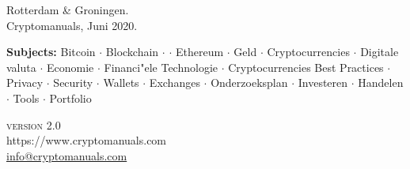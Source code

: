 \begin{titlepage}
{		

        \vspace{1cm}
        
        \small{
        Rotterdam \& Groningen.\\
        Cryptomanuals, Juni 2020.}
        
        \vspace{.5cm}
        
        \small{\textbf{Subjects:} Bitcoin $\cdot$ Blockchain $\cdot$  $\cdot$ Ethereum $\cdot$ Geld $\cdot$ Cryptocurrencies $\cdot$ Digitale valuta $\cdot$ Economie $\cdot$ Financi{"e}le Technologie $\cdot$ Cryptocurrencies Best Practices $\cdot$ Privacy $\cdot$ Security $\cdot$ Wallets $\cdot$ Exchanges $\cdot$ Onderzoeksplan $\cdot$ Investeren $\cdot$ Handelen $\cdot$ Tools $\cdot$ Portfolio}

   \vspace{.5cm}
	
		{\textsc{version 2.0}}\\
		\vfill
		{\noindent https://www.cryptomanuals.com}\\ %
	    \href{mailto:info@cryptomanuals.com}{info@cryptomanuals.com}
	}


\end{titlepage}